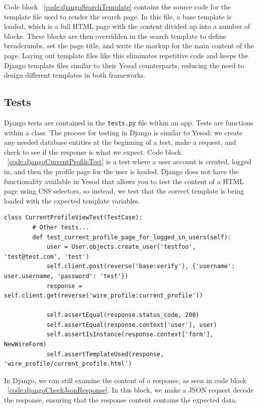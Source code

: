Code block ~\ref{code:djangoSearchTemplate} contains the source code for the
template file used to render the search page. In this file, a base template
is loaded, which is a full HTML page with the content divided up
into a number of blocks. These blocks are then overridden in the search template
to define breadcrumbs, set the page title, and write the markup for the main
content of the page. Laying out template files like this eliminates repetitive
code and keeps the Django template files similar to their Yesod counterparts,
reducing the need to design different templates in both frameworks.

\subsection{Tests}

Django tests are contained in the \texttt{tests.py} file within an app. Tests
are functions within a class. The process for testing in Django is similar to
Yesod: we create any needed database entities at the beginning of a test,
make a request, and check to see if the response is what we expect. Code
block ~\ref{code:djangoCurrentProfileTest} is a test where a user account
is created, logged in, and then the profile page for the user is loaded.
Django does not have the functionality available in Yesod that allows you
to test the content of a HTML page using CSS selectors, so instead, we test
that the correct template is being loaded with the expected template variables.

\begin{lstlisting}[caption={Django current profile test},label={code:djangoCurrentProfileTest}]
	class CurrentProfileViewTest(TestCase):
		# Other tests...
		def test_current_profile_page_for_logged_in_users(self):
			user = User.objects.create_user('testfoo', 'test@test.com', 'test')
			self.client.post(reverse('base:verify'), {'username': user.username, 'password': 'test'})
			response = self.client.get(reverse('wire_profile:current_profile'))

			self.assertEqual(response.status_code, 200)
			self.assertEqual(response.context['user'], user)
			self.assertIsInstance(response.context['form'], NewWireForm)
			self.assertTemplateUsed(response, 'wire_profile/current_profile.html')
\end{lstlisting}

In Django, we can still examine the content of a response, as seen in code block ~\ref{code:djangoCheckJsonResponse}.
In this block, we make a JSON request decode the response, ensuring that the response
content contains the expected data.

